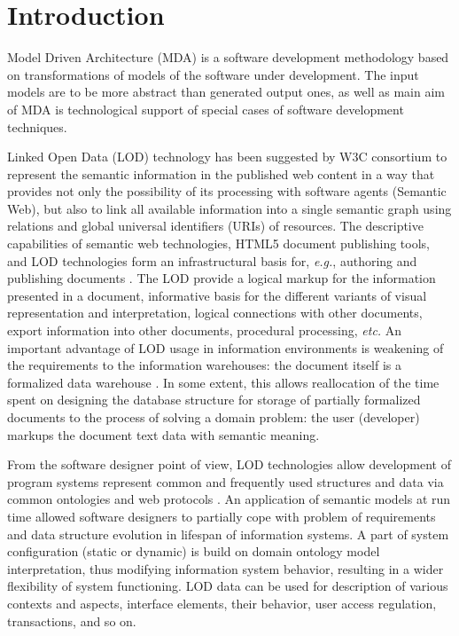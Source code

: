 \documentclass[runningheads]{llncs}
\begin{document}
\section{Introduction}

Model Driven Architecture (MDA) is a software development methodology based on transformations of models of the software under development.  The input models are to be more abstract than generated output ones, as well as main aim of MDA is technological support of special cases of software development techniques.

Linked Open Data (LOD) \cite{Bizer} technology has been suggested by W3C consortium to represent the semantic information in the published web content in a way that provides not only the possibility of its processing with software agents (Semantic Web), but also to link all available information into a single semantic graph using relations and global universal identifiers (URIs) of resources. The descriptive capabilities of semantic web technologies, HTML5 document publishing tools, and LOD technologies form an infrastructural basis for, \emph{e.g.}, authoring and publishing documents \cite{Capadisli}. The LOD provide a logical markup for the information presented in a document, informative basis for the different variants of visual representation and interpretation, logical connections with other documents, export information into other documents, procedural processing, \emph{etc.} An important advantage of LOD usage in information environments is weakening of the requirements to the information warehouses: the document itself is a formalized data warehouse \cite{Cherk}. In some extent, this allows reallocation of the time spent on designing the database structure for storage of partially formalized documents to the process of solving a domain problem: the user (developer) markups the document text data with semantic meaning.

From the software designer point of view, LOD technologies allow development of program systems represent common and frequently used structures and data via common ontologies and web protocols \cite{Cherk}.  An application of semantic models at run time \cite{Kopay} allowed software designers to partially cope with problem of requirements and data structure evolution in lifespan of information systems.  A part of system configuration (static or dynamic) is build on domain ontology model interpretation, thus modifying information system behavior, resulting in a wider flexibility of system functioning.  LOD data can be used for description of various contexts and aspects, interface elements, their behavior, user access regulation, transactions, and so on.
\end{document}
